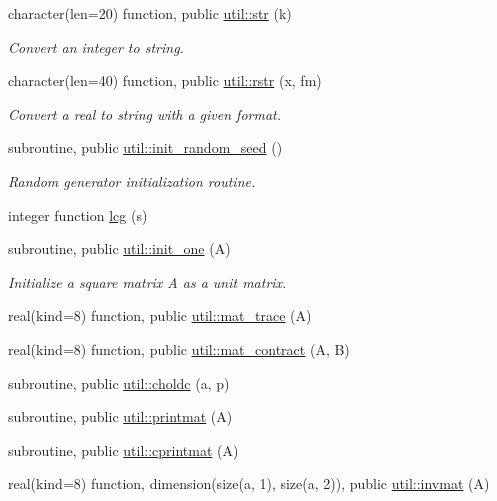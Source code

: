\begin{DoxyCompactItemize}
\item 
character(len=20) function, public \hyperlink{namespaceutil_a1df36d0696c9183ceb6bb770f1d88111}{util\+::str} (k)
\begin{DoxyCompactList}\small\item\em Convert an integer to string. \end{DoxyCompactList}\item 
character(len=40) function, public \hyperlink{namespaceutil_ac1630658a46867b1f7255eaa51198bf3}{util\+::rstr} (x, fm)
\begin{DoxyCompactList}\small\item\em Convert a real to string with a given format. \end{DoxyCompactList}\item 
subroutine, public \hyperlink{namespaceutil_a3c2dcf05b068a55f0066d2b393e75dc7}{util\+::init\+\_\+random\+\_\+seed} ()
\begin{DoxyCompactList}\small\item\em Random generator initialization routine. \end{DoxyCompactList}\item 
integer function \hyperlink{util_8f90_a669ac8da4cdd11efd16a0ef72a4f7915}{lcg} (s)
\item 
subroutine, public \hyperlink{namespaceutil_aca7f2465fedb87fef954d8f0c30668c7}{util\+::init\+\_\+one} (A)
\begin{DoxyCompactList}\small\item\em Initialize a square matrix A as a unit matrix. \end{DoxyCompactList}\item 
real(kind=8) function, public \hyperlink{namespaceutil_a9771c95546d8658e72aa24f76612e4d8}{util\+::mat\+\_\+trace} (A)
\item 
real(kind=8) function, public \hyperlink{namespaceutil_a8a0e15c77e8cd4cb03b608e4d6bfba67}{util\+::mat\+\_\+contract} (A, B)
\item 
subroutine, public \hyperlink{namespaceutil_ab832eeb8a78ffacc12e3ceac27f95ee7}{util\+::choldc} (a, p)
\item 
subroutine, public \hyperlink{namespaceutil_a71eb7216e62e0978ad1424bd4dbd727a}{util\+::printmat} (A)
\item 
subroutine, public \hyperlink{namespaceutil_ac600300c2251c6c6b555fe7255605aa5}{util\+::cprintmat} (A)
\item 
real(kind=8) function, dimension(size(a, 1), size(a, 2)), public \hyperlink{namespaceutil_a52a5fbd944196d1cf077be77aefa34a2}{util\+::invmat} (A)

\end{DoxyCompactItemize}
